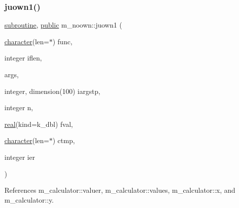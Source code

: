 \subsubsection{\texorpdfstring{juown1()}{juown1()}}
{\footnotesize\ttfamily \hyperlink{M__stopwatch_83_8txt_acfbcff50169d691ff02d4a123ed70482}{subroutine}, \hyperlink{M__stopwatch_83_8txt_a2f74811300c361e53b430611a7d1769f}{public} m\+\_\+noown\+::juown1 (\begin{DoxyParamCaption}\item[{\hyperlink{option__stopwatch_83_8txt_abd4b21fbbd175834027b5224bfe97e66}{character}(len=$\ast$)}]{func,  }\item[{integer}]{iflen,  }\item[{}]{args,  }\item[{integer, dimension(100)}]{iargstp,  }\item[{integer}]{n,  }\item[{\hyperlink{read__watch_83_8txt_abdb62bde002f38ef75f810d3a905a823}{real}(kind=k\+\_\+dbl)}]{fval,  }\item[{\hyperlink{option__stopwatch_83_8txt_abd4b21fbbd175834027b5224bfe97e66}{character}(len=$\ast$)}]{ctmp,  }\item[{integer}]{ier }\end{DoxyParamCaption})}



References m\+\_\+calculator\+::valuer, m\+\_\+calculator\+::values, m\+\_\+calculator\+::x, and m\+\_\+calculator\+::y.

